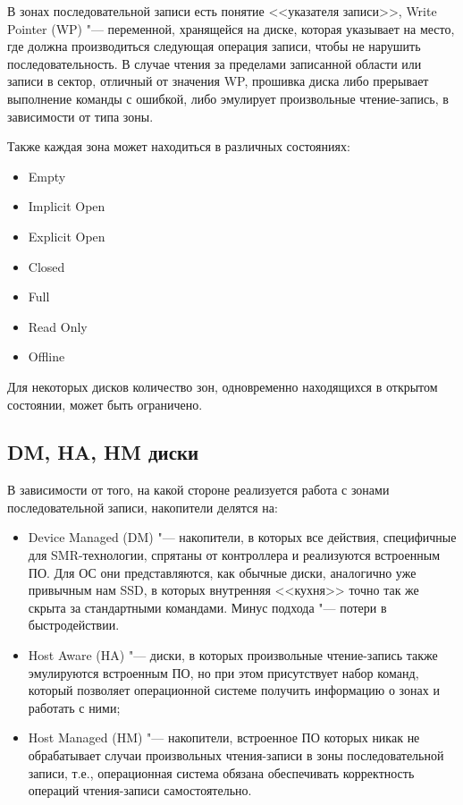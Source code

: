 \documentclass[10pt, a5paper]{article}
\begin{document}
В зонах последовательной записи есть понятие <<указателя записи>>, Write Pointer (WP) "--- переменной, хранящейся на диске, которая указывает на место, где должна производиться следующая операция записи, чтобы не нарушить последовательность. В случае чтения за пределами записанной области или записи в сектор, отличный от значения WP, прошивка диска либо прерывает выполнение команды с ошибкой, либо эмулирует произвольные чтение-запись, в зависимости от типа зоны.

Также каждая зона может находиться в различных состояниях:

\begin{itemize}
  \item Empty
  \item Implicit Open
  \item Explicit Open
  \item Closed
  \item Full
  \item Read Only
  \item Offline
\end{itemize}

Для некоторых дисков количество зон, одновременно находящихся в открытом состоянии, может быть ограничено.

\subsection*{DM, HA, HM диски}

В зависимости от того, на какой стороне реализуется работа с зонами последовательной записи, накопители делятся на:

\begin{itemize}
  \item Device Managed (DM) "--- накопители, в которых все действия, специфичные для SMR-технологии, спрятаны от контроллера и реализуются встроенным ПО. Для ОС они представляются, как обычные диски, аналогично уже привычным нам SSD, в которых внутренняя <<кухня>> точно так же скрыта за стандартными командами. Минус подхода "--- потери в быстродействии.
  \item Host Aware (HA) "--- диски, в которых произвольные чтение-запись также эмулируются встроенным ПО, но при этом присутствует набор команд, который позволяет операционной системе получить информацию о зонах и работать с ними;
  \item Host Managed (HM) "--- накопители, встроенное ПО которых никак не обрабатывает случаи произвольных чтения-записи в зоны последовательной записи, т.е., операционная система обязана обеспечивать корректность операций чтения-записи самостоятельно.
\end{itemize}
\end{document}
